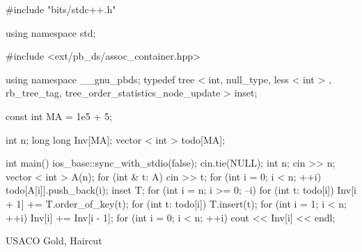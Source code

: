 \documentclass{trkut}
\theoremstyle{definition}
\begin{document}
\begin{cclol}
#include "bits/stdc++.h"

using namespace std;

#include <ext/pb_ds/assoc_container.hpp>

using namespace __gnu_pbds;
typedef tree < int, null_type, less < int > , 
rb_tree_tag, tree_order_statistics_node_update > inset;

const int MA = 1e5 + 5;

int n;
long long Inv[MA];
vector < int > todo[MA];

int main() {
  ios_base::sync_with_stdio(false);
  cin.tie(NULL);
  int n;
  cin >> n;
  vector < int > A(n);
  for (int & t: A) cin >> t;
  for (int i = 0; i < n; ++i) todo[A[i]].push_back(i);
  inset T;
  for (int i = n; i >= 0; --i) {
    for (int t: todo[i]) Inv[i + 1] += T.order_of_key(t);
    for (int t: todo[i]) T.insert(t);
  }
  for (int i = 1; i < n; ++i) Inv[i] += Inv[i - 1];
  for (int i = 0; i < n; ++i) cout << Inv[i] << endl;
}
\end{cclol}
\begin{kk}[H]
    \caption{USACO Gold, Haircut}%
    \end{kk}
\end{document}

